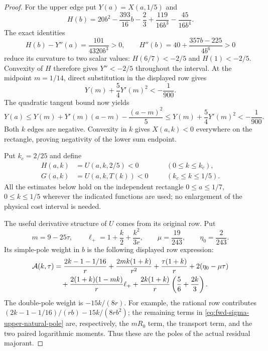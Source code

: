 \begin{proof}
For the upper edge put $Y(a)=X(a,1/5)$ and
\[
 H(b)=20b^2-\frac{393}{16}b-\frac23
                       +\frac{119}{16b^3}-\frac{45}{16b^4}.
\]
The exact identities
\[
 H(b)-Y''(a)=\frac{101}{4320b^3}>0,\qquad
 H''(b)=40+\frac{357b-225}{4b^6}>0
\]
reduce its curvature to two scalar values:
$H(6/7)<-2/5$ and $H(1)<-2/5$.
Convexity of $H$ therefore gives $Y''<-2/5$ throughout the interval.
At the midpoint $m=1/14$, direct substitution in the displayed row gives
\[
 Y(m)+\frac54Y'(m)^2<-\frac1{900}.
\]
The quadratic tangent bound now yields
\[
 Y(a)\le Y(m)+Y'(m)(a-m)-\frac{(a-m)^2}{5}
       \le Y(m)+\frac54Y'(m)^2<-\frac1{900}.
\]
Both $k$ edges are negative. Convexity in $k$ gives $X(a,k)<0$ everywhere
on the rectangle, proving negativity of the lower sum endpoint.


Put $k_c=2/25$ and define
\begin{equation}\label{eq:fwd-sigma-upper-two-functions}
 \begin{aligned}
 H(a,k)&=U(a,k,2/5)<0&&\quad(0\leq k\leq k_c),\\
 G(a,k)&=U(a,k,T(k))<0&&\quad(k_c\leq k\leq1/5).
 \end{aligned}
\end{equation}
All the estimates below hold on the independent rectangle
$0\leq a\leq1/7$, $0\leq k\leq1/5$ wherever the indicated functions
are used; no enlargement of the physical cost interval is needed.

The useful derivative structure of $U$ comes from its original row.
Put
\[
 m=9-25\tau,\qquad \ell_+=1+\frac k2+\frac{k^2}{3r},\qquad
 \mu=\frac{19}{243},\qquad \eta_0=\frac2{243}.
\]
Its simple-pole weight in $b$ is the following displayed row expression:
\begin{align}\label{eq:fwd-sigma-upper-natural-pole}
 \mathcal A(k,\tau)
 &=\frac{2k-1-1/16}{r}
   +\frac{2mk(1+k)}{r^2}+\frac{\tau(1+k)}r+2(\eta_0-\mu\tau)\notag\\
 &\quad+\frac{2(1+k)(1-mk)}r\ell_+
       +\frac{2k(1+k)}r\left(\frac56+\frac{2k}3\right).
\end{align}
The double-pole weight is $-15k/(8r)$. For example, the rational row
contributes $(2k-1-1/16)/(rb)-15k/(8rb^2)$; the remaining terms in
\eqref{eq:fwd-sigma-upper-natural-pole} are, respectively, the $mR_0$
term, the transport term, and the two paired logarithmic moments.
Thus these are the poles of the actual residual majorant.


\end{proof}
